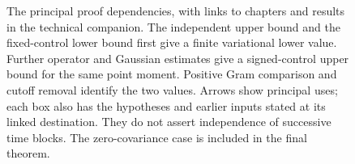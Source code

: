 \begin{figure}
  \caption[Proof dependencies and destinations]{The principal proof
    dependencies, with links to chapters and results in the technical companion.
    The independent
    upper bound and the fixed-control lower bound first give a finite
    variational lower value. Further operator and Gaussian estimates give a
    signed-control upper bound for the same point moment. Positive Gram
    comparison and cutoff removal identify the two values. Arrows show
    principal uses; each box also has the hypotheses and earlier inputs stated
    at its linked destination. They do not assert independence of successive
    time blocks. The zero-covariance case is included in the final theorem.}
  \label{Fig:proof-map}
\end{figure}
